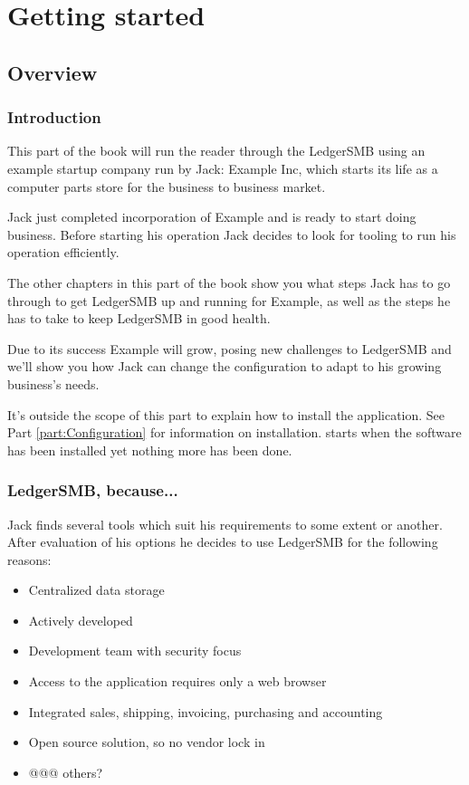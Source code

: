 

\part{Getting started}
\label{part:GettingStarted}

\chapter{Overview}

\section{Introduction}

This part of the book will run the reader through the LedgerSMB using an example
startup company run by Jack: Example Inc, which starts its life as a computer parts
store for the business to business market.

Jack just completed incorporation of Example and is ready to start doing business.
Before starting his operation Jack decides to look for tooling to run his operation
efficiently.

The other chapters in this part of the book show you what steps Jack has to go through
to get LedgerSMB up and running for Example, as well as the steps he has to take to
keep LedgerSMB in good health.

Due to its success Example will grow, posing new challenges to LedgerSMB and we'll show
you how Jack can change the configuration to adapt to his growing business's needs.

It's outside the scope of this part to explain how to install the application. See
Part \ref{part:Configuration} for information on installation. 
starts when the software has been installed yet nothing more has been done.

\section{LedgerSMB, because...}

Jack finds several tools which suit his requirements to some extent or another.
After evaluation of his options he decides to use LedgerSMB for the following reasons:

\begin{itemize}
\item Centralized data storage
\item Actively developed
\item Development team with security focus
\item Access to the application requires only a web browser
\item Integrated sales, shipping, invoicing, purchasing and accounting
\item Open source solution, so no vendor lock in
\item @@@ others?
\end{itemize}

